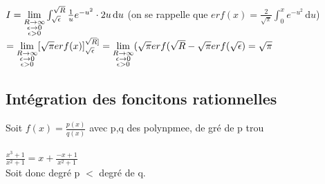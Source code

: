 \documentclass[12pt,a4paper]{article}
\begin{document}
{$I = \lim\limits_{\substack{R \to \infty \\ \epsilon \to 0 \\ \epsilon > 0}} \int_{\sqrt{\epsilon}}^{\sqrt{R}} \frac{1}{u}e^{-u^2}\cdot 2u \, \mathrm du$ (on se rappelle que $erf(x) = \frac{2}{\sqrt{\pi}} \int_0^x e^{-u^2} \, \mathrm du$)\\
$= \lim\limits_{\substack{R \to \infty \\ \epsilon \to 0 \\ \epsilon > 0}} [\sqrt{\pi}erf(x)]_{\sqrt{\epsilon}}^{\sqrt{R}]}\\
= \lim\limits_{\substack{R \to \infty \\ \epsilon \to 0 \\ \epsilon > 0}} (\sqrt{\pi} erf(\sqrt{R} - \sqrt{\pi}erf(\sqrt{\epsilon}) = \sqrt{\pi}$

\subsection{Intégration des foncitons rationnelles}
Soit $f(x) = \frac{p(x)}{q(x)}$ avec p,q des polynpmee, de gré de p {trou}\\
\\
 $ \frac{x^3+1}{x^2+1} = x + \frac{-x+1}{x^2+1}$\\
Soit donc degré p $<$ degré de q.

}
\end{document}

